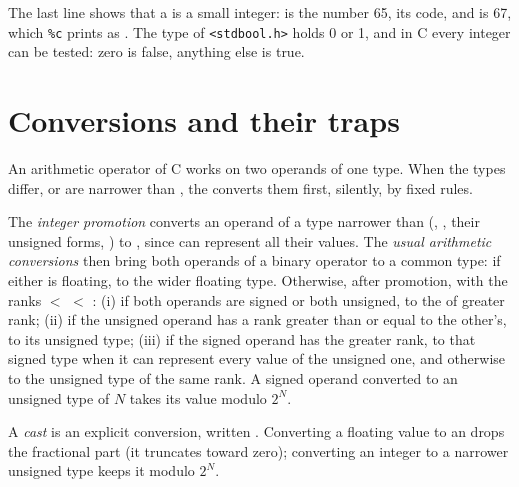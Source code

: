 The last line shows that a  is a small integer:  is the number 65, its code, and 
is 67, which \texttt{\%c} prints as . The type  of \texttt{<stdbool.h>} holds 0 or 1, and in C
every integer can be tested: zero is false, anything else is true.

\section{Conversions and their traps}\label{sec:b1:c-types-and-control:conversions}

An arithmetic operator of C works on two operands of one type. When the types differ, or are narrower than
, the  converts them first, silently, by fixed rules.

\begin{definition}\label{def:b1:c-types-and-control:promotion}
The \emph{integer promotion} converts an operand of a type narrower than 
(, , their unsigned forms, ) to , since  can represent all
their values. The \emph{usual arithmetic conversions} then bring both
operands of a binary operator to a common type: if either is floating, to the wider floating type. Otherwise,
after promotion, with the ranks  $<$  $<$ : (i) if both operands are signed or
both unsigned, to the  of greater rank; (ii) if the unsigned operand has a rank greater than or
equal to the other's, to its unsigned type; (iii) if the signed operand has the greater rank, to that signed type
when it can represent every value of the unsigned one, and otherwise to the unsigned type of the same rank. A signed
operand converted to an unsigned type of  $N$ takes its value modulo $2^N$.
\end{definition}

\begin{definition}[Cast]\label{def:b1:c-types-and-control:cast}
A \emph{cast} is an explicit conversion, written . Converting a floating value
to an  drops the fractional part (it truncates toward zero); converting an integer to a narrower
unsigned type keeps it modulo $2^N$.
\end{definition}

